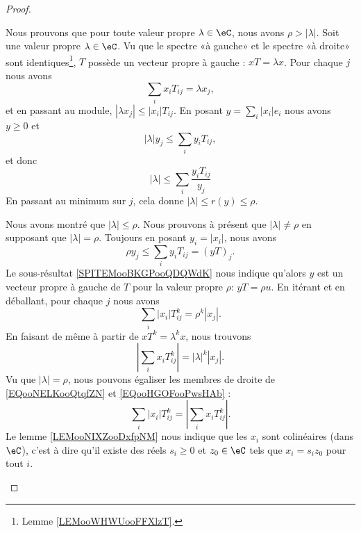 \begin{proof}
\begin{subproof}
		Nous prouvons que pour toute valeur propre \( \lambda\in \eC\), nous avons \( \rho>| \lambda |\). Soit une valeur propre \( \lambda\in \eC\). Vu que le spectre «à gauche»  et le spectre «à droite» sont identiques\footnote{Lemme \ref{LEMooWHWUooFFXlzT}.}, \( T\) possède un vecteur propre à gauche : \( xT=\lambda x\). Pour chaque \( j\) nous avons
		\begin{equation}
			\sum_ix_iT_{ij}=\lambda x_j,
		\end{equation}
		et en passant au module, \( | \lambda x_j |\leq | x_i |T_{ij}\). En posant \( y=\sum_i| x_i |e_i\) nous avons \( y\geq 0\) et
		\begin{equation}
			| \lambda |y_j\leq \sum_iy_iT_{ij},
		\end{equation}
		et donc
		\begin{equation}
			| \lambda |\leq \sum_i\frac{ y_iT_{ij} }{ y_j }
		\end{equation}
		En passant au minimum sur \( j\), cela donne \( | \lambda |\leq r(y)\leq \rho\).

		Nous avons montré que \( | \lambda |\leq \rho\). Nous prouvons à présent que \( | \lambda |\neq \rho\) en supposant que \( | \lambda |=\rho\). Toujours en posant \( y_i=| x_i |\), nous avons
		\begin{equation}
			\rho y_j\leq \sum_iy_iT_{ij}=(yT)_j.
		\end{equation}
		Le sous-résultat \ref{SPITEMooBKGPooQDQWdK} nous indique qu'alors \( y\) est un vecteur propre à gauche de \( T\) pour la valeur propre \( \rho\): \( yT=\rho u\). En itérant et en déballant, pour chaque \( j\) nous avons
		\begin{equation}        \label{EQooNELKooQtqfZN}
			\sum_i| x_i |T_{ij}^k=\rho^k| x_j |.
		\end{equation}
		En faisant de même à partir de \( xT^k=\lambda^kx\), nous trouvons
		\begin{equation}        \label{EQooHGOFooPwsHAb}
			| \sum_ix_iT_{ij}^k |=| \lambda |^k| x_j |.
		\end{equation}
		Vu que \( | \lambda |=\rho\), nous pouvons égaliser les membres de droite de \eqref{EQooNELKooQtqfZN} et \eqref{EQooHGOFooPwsHAb} :
		\begin{equation}
			\sum_i| x_i |T_{ij}^k=| \sum_ix_iT_{ij}^k |.
		\end{equation}
		Le lemme \ref{LEMooNIXZooDxfpNM} nous indique que les \( x_i\) sont colinéaires (dans \( \eC\)), c'est à dire qu'il existe des réels \( s_i\geq 0\) et \( z_0\in \eC\) tels que \( x_i=s_iz_0\) pour tout \( i\).


\end{subproof}
\end{proof}
